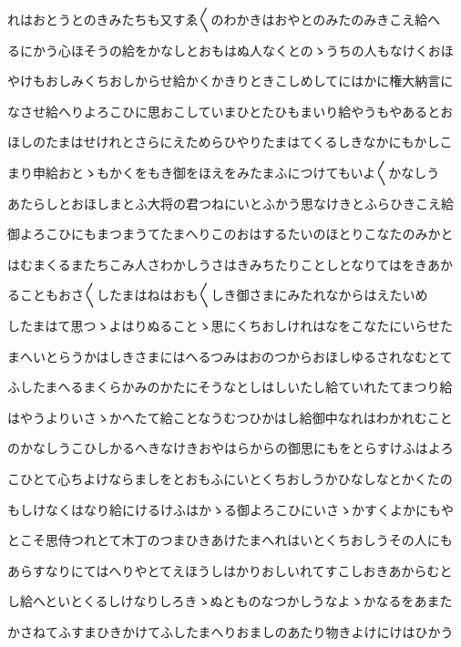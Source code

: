 \documentclass[a4paper,11pt,landscape]{ltjtarticle}
\begin{document}
\par\medskip
れはおとうとのきみたちも又すゑ〱のわかきはおやとのみたのみきこえ給へ
\par\medskip
るにかう心ほそうの給をかなしとおもはぬ人なくとのゝうちの人もなけくおほ
\par\medskip
やけもおしみくちおしからせ給かくかきりときこしめしてにはかに権大納言に
\par\medskip
なさせ給へりよろこひに思おこしていまひとたひもまいり給やうもやあるとお
\par\medskip
ほしのたまはせけれとさらにえためらひやりたまはてくるしきなかにもかしこ
\par\medskip
まり申給おとゝもかくをもき御をほえをみたまふにつけてもいよ〱かなしう
\par\medskip
あたらしとおほしまとふ大将の君つねにいとふかう思なけきとふらひきこえ給
\par\medskip
御よろこひにもまつまうてたまへりこのおはするたいのほとりこなたのみかと
\par\medskip
はむまくるまたちこみ人さわかしうさはきみちたりことしとなりてはをきあか
\par\medskip
ることもおさ〱したまはねはおも〱しき御さまにみたれなからはえたいめ
\par\medskip
したまはて思つゝよはりぬることゝ思にくちおしけれはなをこなたにいらせた
\par\medskip
まへいとらうかはしきさまにはへるつみはおのつからおほしゆるされなむとて
\par\medskip
ふしたまへるまくらかみのかたにそうなとしはしいたし給ていれたてまつり給
\par\medskip
はやうよりいさゝかへたて給ことなうむつひかはし給御中なれはわかれむこと
\par\medskip
のかなしうこひしかるへきなけきおやはらからの御思にもをとらすけふはよろ
\par\medskip
こひとて心ちよけならましをとおもふにいとくちおしうかひなしなとかくたの
\par\medskip
もしけなくはなり給にけるけふはかゝる御よろこひにいさゝかすくよかにもや
\par\medskip
とこそ思侍つれとて木丁のつまひきあけたまへれはいとくちおしうその人にも
\par\medskip
あらすなりにてはへりやとてえほうしはかりおしいれてすこしおきあからむと
\par\medskip
し給へといとくるしけなりしろきゝぬとものなつかしうなよゝかなるをあまた
\par\medskip
かさねてふすまひきかけてふしたまへりおましのあたり物きよけにけはひかう
\par\medskip
\end{document}
